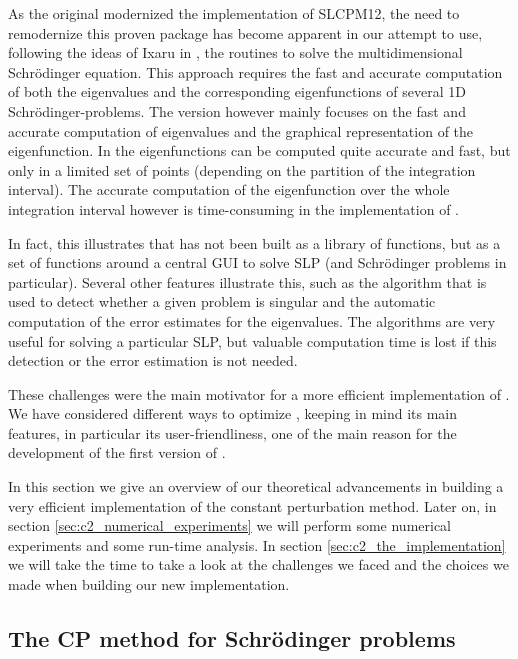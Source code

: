 As the original \matslise{} modernized the implementation of SLCPM12, the need to remodernize this proven package has become apparent in our attempt to use, following the ideas of Ixaru in \cite{ixaru_new_2010}, the \matslise{} routines to solve the multidimensional Schrödinger equation. This approach requires the fast and accurate computation of both the eigenvalues and the corresponding eigenfunctions of several 1D Schrödinger-problems. The  version however mainly focuses on the fast and accurate computation of eigenvalues and the graphical representation of the eigenfunction. In  the eigenfunctions can be computed quite accurate and fast, but only in a limited set of points (depending on the partition of the integration interval). The accurate computation of the eigenfunction over the whole integration interval however is time-consuming in the implementation of .

In fact, this illustrates that  has not been built as a library of functions, but as a set of functions around a central GUI to solve SLP (and Schrödinger problems in particular). Several other features illustrate this, such as the algorithm that is used to detect whether a given problem is singular and the automatic computation of the error estimates for the eigenvalues. The algorithms are very useful for solving a particular SLP, but valuable computation time is lost if this detection or the error estimation is not needed.

These challenges were the main motivator for a more efficient implementation of \matslise{}. We have considered different ways to optimize \matslise{}, keeping in mind its main features, in particular its user-friendliness, one of the main reason for the development of the first version of \matslise{}.

In this section we give an overview of our theoretical advancements \cite{baeyens_fast_2020} in building a very efficient implementation of the constant perturbation method. Later on, in section \ref{sec:c2_numerical_experiments} we will perform some numerical experiments and some run-time analysis. In section \ref{sec:c2_the_implementation} we will take the time to take a look at the challenges we faced and the choices we made when building our new implementation.

\subsection{The CP method for Schrödinger problems}\label{the-method}

